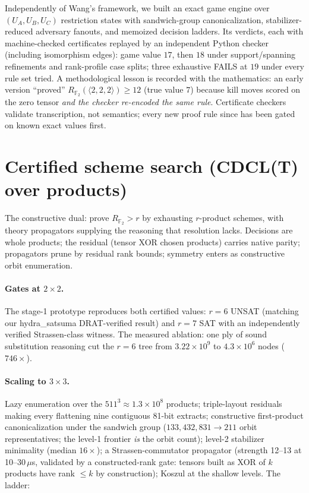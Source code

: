 \documentclass[11pt]{article}
\theoremstyle{definition}
\newcommand{\F}{\mathbb{F}_2}
\begin{document}
Independently of Wang's framework, we built an exact game engine over
$(U_A, U_B, U_C)$ restriction states with sandwich-group canonicalization,
stabilizer-reduced adversary fanouts, and memoized decision ladders. Its
verdicts, each with machine-checked certificates replayed by an
independent Python checker (including isomorphism edges):
game value $17$, then $18$ under support/spanning refinements and
rank-profile case splits; three exhaustive FAILS at $19$ under every rule
set tried. A methodological lesson is recorded with the mathematics: an
early version ``proved'' $R_{\F}(\langle 2,2,2\rangle)\ge 12$ (true value
$7$) because kill moves scored on the zero tensor \emph{and the checker
re-encoded the same rule}. Certificate checkers validate transcription,
not semantics; every new proof rule since has been gated on known exact
values first.

\section{Certified scheme search (CDCL(T) over products)}
\label{sec:search}
\label{sec:cdclt}

The constructive dual: prove $R_{\F} > r$ by exhausting $r$-product
schemes, with theory propagators supplying the reasoning that resolution
lacks. Decisions are whole products; the residual (tensor XOR chosen
products) carries native parity; propagators prune by residual rank
bounds; symmetry enters as constructive orbit enumeration.

\paragraph{Gates at $2\times 2$.} The stage-1 prototype reproduces both
certified values: $r=6$ UNSAT (matching our hydra\_satsuma DRAT-verified
result) and $r=7$ SAT with an independently verified Strassen-class
witness. The measured ablation: one ply of sound substitution reasoning
cut the $r=6$ tree from $3.22\times 10^9$ to $4.3\times 10^6$ nodes
($746\times$).

\paragraph{Scaling to $3\times 3$.} Lazy enumeration over the $511^3
\approx 1.3\times 10^8$ products; triple-layout residuals making every
flattening nine contiguous 81-bit extracts; constructive first-product
canonicalization under the sandwich group ($133{,}432{,}831 \to 211$
orbit representatives; the level-1 frontier \emph{is} the orbit count);
level-2 stabilizer minimality (median $16\times$); a Strassen-commutator
propagator (strength 12--13 at 10--30\,$\mu$s, validated by a
constructed-rank gate: tensors built as XOR of $k$ products have rank
$\le k$ by construction); Koszul at the shallow levels. The ladder:
\end{document}
